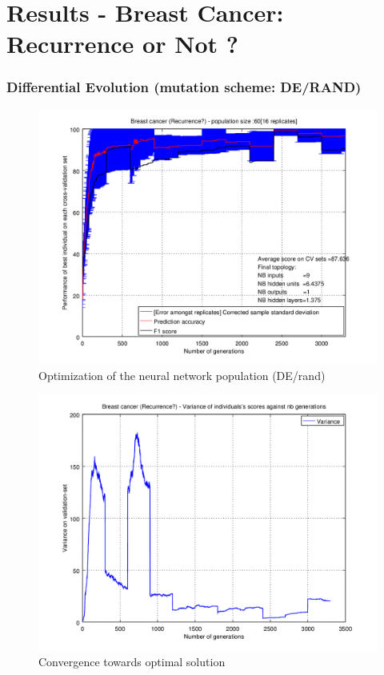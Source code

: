 \documentclass[a4paper,12pt, oneside]{memoir}
\begin{document}
\chapter{Results - Breast Cancer: Recurrence or Not ?} \label{complementary-results-recurrence}


\subsection{Differential Evolution (mutation scheme: DE/RAND)}

\begin{figure}[h]
\centering
  \includegraphics[scale=0.65]{recurrence-performancesVSepochs-DE}
  \vspace{-12pt}
  \caption{Optimization of the neural network population (DE/rand)}
  \label{recurrence-perfs}
\end{figure}
\vspace{-10pt}

\begin{figure}[h]
\centering
  \includegraphics[scale=0.65]{recurrence-varianceVSepochs-DE}
  \vspace{-12pt}
  \caption{Convergence towards optimal solution}
  \label{recurrence-variance}
\end{figure}
\vspace{-10pt}
\end{document}

